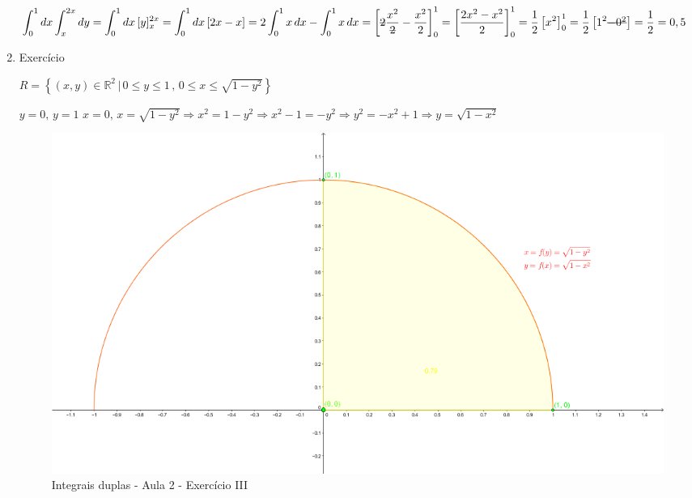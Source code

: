 \documentclass[12pt, a4paper]{article}
\newcommand{\integral}{\displaystyle\int}
\newcommand{\overstrike}[1]{\ifmmode\text{\sout{\ensuremath{#1}}}\else\sout{#1}\fi}
\begin{document}
\begin{enumerate}
				$\integral_0^1 dx \integral_{x}^{2x} dy = 
				\integral_0^1 dx\, [y]_{x}^{2x} = \integral_0^1 dx\, [2x - x] =
				2\integral_0^1 x\, dx - \integral_0^1 x\, dx =
				\left[\overstrike{2}\dfrac{x^2}{\overstrike{2}} - 
				\dfrac{x^2}{2}\right]_0^1 = 
				\left[\dfrac{2x^2 - x^2}{2}\right]_0^1 = 
				\dfrac{1}{2}\left[x^2\right]_0^1 = 
				\dfrac{1}{2}\left[1^2 \overstrike{- 0^2}\right] = \dfrac{1}{2} = 0,5 $\newline
				
				\item Exercício
				
				$R = \left\{(x, y) \in \mathbb{R}^2 \,|\, 0 \leq y \leq 1 \,,\, 
				0 \leq x \leq \sqrt{1 - y^2} \right\}$
				
				$y = 0,\, y=1$\newline
				$x = 0,\, x = \sqrt{1 - y^2} \Rightarrow 
				x^2 = 1 - y^2 \Rightarrow x^2 - 1 = -y^2 \Rightarrow 
				y^2 = -x^2 + 1 \Rightarrow y = \sqrt{1 -x^2}$
								
				\begin{figure}[H]
					\centering
					\includegraphics[width=\textwidth]{v01_a02_e03.png}
					\caption{Integrais duplas - Aula 2 - Exercício III}
					\label{v01_a02_e03}
				\end{figure}
				

\end{enumerate}
\end{document}
